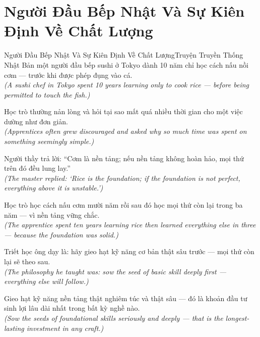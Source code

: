 \section{Người Đầu Bếp Nhật Và Sự Kiên Định Về Chất Lượng}
\begin{truyen}{Người Đầu Bếp Nhật Và Sự Kiên Định Về Chất Lượng}{Truyện Truyền Thống Nhật Bản}
 một người đầu bếp sushi ở Tokyo dành 10 năm chỉ học cách nấu nồi cơm --- trước khi được phép đụng vào cá.\\[4pt]
\textit{(A sushi chef in Tokyo spent 10 years learning only to cook rice --- before being permitted to touch the fish.)}

Học trò thường nản lòng và hỏi tại sao mất quá nhiều thời gian cho một việc dường như đơn giản.\\[4pt]
\textit{(Apprentices often grew discouraged and asked why so much time was spent on something seemingly simple.)}

Người thầy trả lời: ``Cơm là nền tảng; nếu nền tảng không hoàn hảo, mọi thứ trên đó đều lung lay.''\\[4pt]
\textit{(The master replied: `Rice is the foundation; if the foundation is not perfect, everything above it is unstable.')}

Học trò học cách nấu cơm mười năm rồi sau đó học mọi thứ còn lại trong ba năm --- vì nền tảng vững chắc.\\[4pt]
\textit{(The apprentice spent ten years learning rice then learned everything else in three --- because the foundation was solid.)}

Triết học ông dạy là: hãy gieo hạt kỹ năng cơ bản thật sâu trước --- mọi thứ còn lại sẽ theo sau.\\[4pt]
\textit{(The philosophy he taught was: sow the seed of basic skill deeply first --- everything else will follow.)}

\end{truyen}
\begin{baihoc}
  Gieo hạt kỹ năng nền tảng thật nghiêm túc và thật sâu --- đó là khoản đầu tư sinh lợi lâu dài nhất trong bất kỳ nghề nào.\\[4pt]
  \textit{(Sow the seeds of foundational skills seriously and deeply --- that is the longest-lasting investment in any craft.)}
\end{baihoc}
